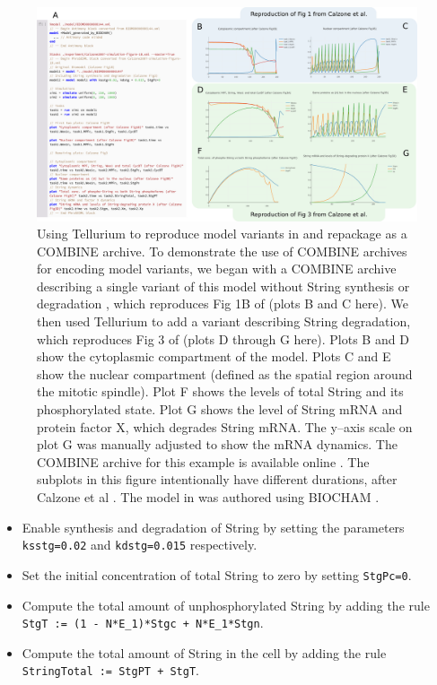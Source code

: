 \documentclass[10pt,letterpaper]{article}
\begin{document}
\begin{figure}
  \includegraphics[width=1.0\textwidth]{fig-calzone.pdf}
  \caption{Using Tellurium to reproduce model variants in \cite{calzone2007dynamical} and repackage as a COMBINE archive. To demonstrate the use of COMBINE archives for encoding model variants, we began with a COMBINE archive describing a single variant of this model without String synthesis or degradation \cite{scharmShowcase}, which reproduces Fig 1B of \cite{calzone2007dynamical} (plots B and C here). We then used Tellurium to add a variant describing String degradation, which reproduces Fig 3 of \cite{calzone2007dynamical} (plots D through G here). Plots B and D show the cytoplasmic compartment of the model. Plots C and E show the nuclear compartment (defined as the spatial region around the mitotic spindle). Plot F shows the levels of total String and its phosphorylated state. Plot G shows the level of String mRNA and protein factor X, which degrades String mRNA. The y--axis scale on plot G was manually adjusted to show the mRNA dynamics. The COMBINE archive for this example is available online \cite{calzone-fig1-fig3}. The subplots in this figure intentionally have different durations, after Calzone et al \cite{calzone2007dynamical}. The model in \cite{calzone2007dynamical} was authored using BIOCHAM \cite{calzone2006biocham}. }
  \label{fig:calzone}
\end{figure}

\begin{itemize}
\item Enable synthesis and degradation of String by setting the parameters \texttt{ksstg=0.02} and \texttt{kdstg=0.015} respectively.
\item Set the initial concentration of total String to zero by setting \texttt{StgPc=0}.
\item Compute the total amount of unphosphorylated String by adding the rule \newline \texttt{StgT := (1 - N*E\_1)*Stgc + N*E\_1*Stgn}.
\item Compute the total amount of String in the cell by adding the rule \newline \texttt{StringTotal := StgPT + StgT}.
\end{itemize}
\end{document}
